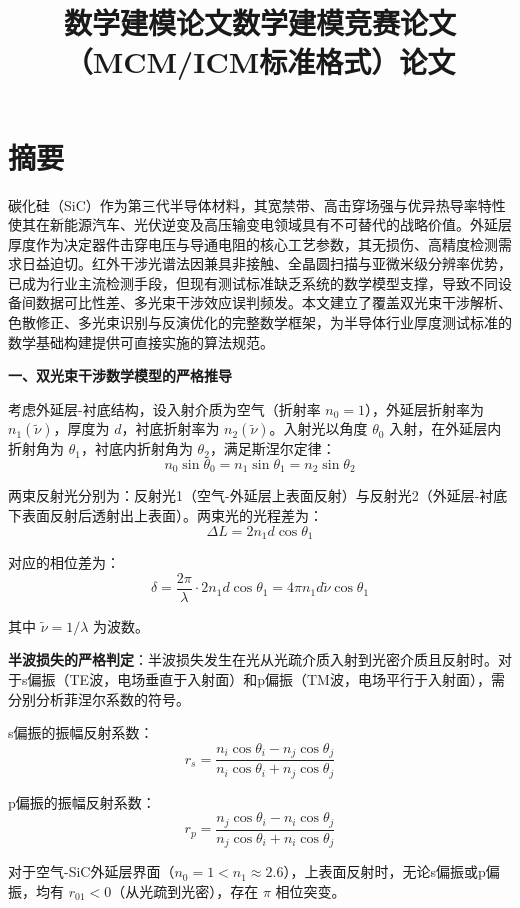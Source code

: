 \documentclass{mcmthesis}
\title{数学建模论文}
\begin{document}
\maketitle

\title{数学建模竞赛论文（MCM/ICM标准格式）论文}

\section{ 摘要}

碳化硅（SiC）作为第三代半导体材料，其宽禁带、高击穿场强与优异热导率特性使其在新能源汽车、光伏逆变及高压输变电领域具有不可替代的战略价值。外延层厚度作为决定器件击穿电压与导通电阻的核心工艺参数，其无损伤、高精度检测需求日益迫切。红外干涉光谱法因兼具非接触、全晶圆扫描与亚微米级分辨率优势，已成为行业主流检测手段，但现有测试标准缺乏系统的数学模型支撑，导致不同设备间数据可比性差、多光束干涉效应误判频发。本文建立了覆盖双光束干涉解析、色散修正、多光束识别与反演优化的完整数学框架，为半导体行业厚度测试标准的数学基础构建提供可直接实施的算法规范。

\textbf{一、双光束干涉数学模型的严格推导}

考虑外延层-衬底结构，设入射介质为空气（折射率 $n_0 = 1$），外延层折射率为 $n_1(\tilde{\nu})$，厚度为 $d$，衬底折射率为 $n_2(\tilde{\nu})$。入射光以角度 $\theta_0$ 入射，在外延层内折射角为 $\theta_1$，衬底内折射角为 $\theta_2$，满足斯涅尔定律：
$$n_0\sin\theta_0 = n_1\sin\theta_1 = n_2\sin\theta_2 \tag{1}$$

两束反射光分别为：反射光1（空气-外延层上表面反射）与反射光2（外延层-衬底下表面反射后透射出上表面）。两束光的光程差为：
$$\Delta L = 2n_1 d\cos\theta_1 \tag{2}$$

对应的相位差为：
$$\delta = \frac{2\pi}{\lambda}\cdot 2n_1 d\cos\theta_1 = 4\pi n_1 d\tilde{\nu}\cos\theta_1 \tag{3}$$

其中 $\tilde{\nu} = 1/\lambda$ 为波数。

\textbf{半波损失的严格判定}：半波损失发生在光从光疏介质入射到光密介质且反射时。对于s偏振（TE波，电场垂直于入射面）和p偏振（TM波，电场平行于入射面），需分别分析菲涅尔系数的符号。

s偏振的振幅反射系数：
$$r_s = \frac{n_i\cos\theta_i - n_j\cos\theta_j}{n_i\cos\theta_i + n_j\cos\theta_j} \tag{4}$$

p偏振的振幅反射系数：
$$r_p = \frac{n_j\cos\theta_i - n_i\cos\theta_j}{n_j\cos\theta_i + n_i\cos\theta_j} \tag{5}$$

对于空气-SiC外延层界面（$n_0=1 < n_1\approx 2.6$），上表面反射时，无论s偏振或p偏振，均有 $r_{01} < 0$（从光疏到光密），存在 $\pi$ 相位突变。
\end{document}
